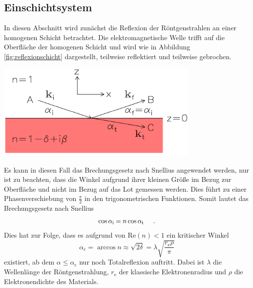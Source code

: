 \documentclass[captions=tableheading]{scrartcl}
\newcommand{\indx}[1]{\text{#1}}
\newcommand{\RE}[1]{\mathrm{Re} \left(#1 \right)}
\begin{document}
\subsection{Einschichtsystem}
In diesen Abschnitt wird zunächst die Reflexion der Röntgenstrahlen an einer homogenen Schicht betrachtet.
Die elektromagnetische Welle trifft auf die Oberfläche der homogenen Schicht und wird wie in Abbildung \ref{fig:reflexionschicht} dargestellt, teilweise reflektiert und teilweise gebrochen.
\begin{center}
	\includegraphics[width=10cm]{images/reflexionschicht.png}
	\label{fig:reflexionschicht}
\end{center}
Es kann in diesen Fall das Brechungsgesetz nach Snellius angewendet werden, nur ist zu beachten, dass die Winkel aufgrund ihrer kleinen Größe im Bezug zur Oberfläche und nicht im Bezug auf das Lot gemessen werden. 
Dies führt zu einer Phasenverschiebung von $\frac{\pi}{2}$ in den trigonometrischen Funktionen.
Somit lautet das Brechungsgesetz nach Snellius
\begin{equation}
\cos \alpha_{\indx{i}}=n\cos \alpha_{\indx{t}} \hspace{0.5cm}\text{.}
\end{equation}
Dies hat zur Folge, dass es aufgrund von $\RE{n}<1 $ ein kritischer Winkel
\begin{equation}
\alpha_{\indx{c}}=\arccos n \approx \sqrt{2\delta } = \lambda \sqrt{\frac{r_{\indx{e}} \rho}{\pi}}
\end{equation}
existiert, ab dem $\alpha \le \alpha_{\indx{c}}$ nur noch Totalreflexion auftritt.
Dabei ist $\lambda$ die Wellenlänge der Röntgenstrahlung, $r_{\indx{e}}$ der klassische Elektronenradius und $\rho$ die Elektronendichte des Materials. 
\end{document}
